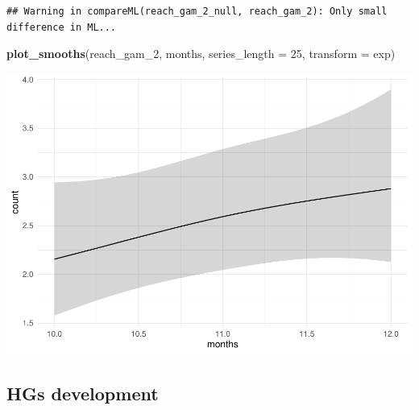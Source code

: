 \documentclass[]{article}
\newenvironment{Shaded}{\begin{snugshade}}{\end{snugshade}}
\newcommand{\DataTypeTok}[1]{\textcolor[rgb]{0.13,0.29,0.53}{#1}}
\newcommand{\DecValTok}[1]{\textcolor[rgb]{0.00,0.00,0.81}{#1}}
\newcommand{\FloatTok}[1]{\textcolor[rgb]{0.00,0.00,0.81}{#1}}
\newcommand{\KeywordTok}[1]{\textcolor[rgb]{0.13,0.29,0.53}{\textbf{#1}}}
\newcommand{\NormalTok}[1]{#1}
\newcommand{\OperatorTok}[1]{\textcolor[rgb]{0.81,0.36,0.00}{\textbf{#1}}}
\newcommand{\StringTok}[1]{\textcolor[rgb]{0.31,0.60,0.02}{#1}}
\begin{document}
\begin{verbatim}
## Warning in compareML(reach_gam_2_null, reach_gam_2): Only small difference in ML...
\end{verbatim}

\begin{Shaded}
\begin{Highlighting}[]
\KeywordTok{plot_smooths}\NormalTok{(reach_gam_}\DecValTok{2}\NormalTok{, months, }\DataTypeTok{series_length =} \DecValTok{25}\NormalTok{, }\DataTypeTok{transform =}\NormalTok{ exp)}
\end{Highlighting}
\end{Shaded}

\includegraphics{supplement_files/figure-latex/reach-gam-2-plot-1.pdf}

\hypertarget{hgs-development}{%
\subsection{HGs development}\label{hgs-development}}

\begin{Shaded}
\end{Shaded}
\end{document}
